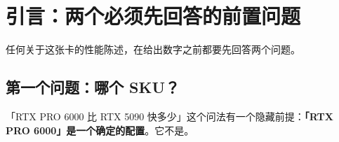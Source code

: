 \begin{abstract}
\textbf{第四，真正的差距出现在容量成为约束的边界上。} RTX 5090 无法加载 120B 模型，而这个系列以 \textbf{163.15 tok/s} 完成 GPT-OSS 120B；Llama 3.3 70B 上差距达 \textbf{928\%}。但这个百分比不是「更快」，而是「对方跑不了」。


\textbf{第五，与上代专业卡比，同一张卡有六个倍率，从 1.09 到 21.3，而它们都不假。}对 L40 Ada，多基准实测中位加速比 \textbf{1.09 倍}、胜率 78\%、最差 0.85 倍、最好 1.67 倍；而厂商宣称最高 \textbf{5.6 倍}（Llama 3 70B 单点口径）。\textbf{0.85 与 5.6 是同一对显卡。}规格上 L2 缓存相对 RTX A6000 是 21.3 倍，而对推理的意义接近于零。渲染则不同：SPECviewperf 15 中位 1.31 倍——因为渲染是算力受限，推理是带宽受限。


\textbf{第六，与数据中心卡的对位分维度给出三种相反结论。} 对 H100 NVL：FP32 领先 2.1 倍、价格便宜 2.1 倍，而 FP64 落后 15 倍、带宽落后 2.2 倍。而解码是带宽受限的，故\textbf{单流解码在物理上不可能追上 H100}——H100 SXM5 的 3,352 GB/s 是这张卡 1,792 GB/s 的 1.87 倍。成本上更尖锐：每芯片每小时 \$0.68 是所列芯片最低（GB300 的 29\%），但每百万 token \$0.19 是 GB300 的约 9.5 倍，因为并发约 10 对约 2,983。


\textbf{第七，同一模型在预填与解码上的排名不同。} DeepSeek-V4/4.1-Flash 是本档案实测最多的模型线（50 条主张、6 种硬件配置）。它在 300 W 档的解码上排第三（102.7 tok/s），在预填上排第四（6,341 tok/s）；同一个模型、同一批数据，两个榜给出不同名次。而它在双卡 RTX PRO 6000 WS 上经五次改动把预填从12,468 提到 13,811 tok/s（8k 上下文），并在单卡上跑满 1,048,576 上下文。


\textbf{第八，96 GB 的收益必须换算成上下文预算才有意义。} 按每 token \textbf{64 KiB} 的 FP16 KV 成本，262K 上下文需 \textbf{16 GiB}，1M 需 \textbf{64 GiB}——后者才是单卡的真实上限，而它的约束不是 KV 而是「剩余 32 GiB 能否装下权重」。



\end{abstract}
\section{引言：两个必须先回答的前置问题}

任何关于这张卡的性能陈述，在给出数字之前都要先回答两个问题。


\subsection{第一个问题：哪个 SKU？}

「RTX PRO 6000 比 RTX 5090 快多少」这个问法有一个隐藏前提：\textbf{「RTX PRO 6000」是一个确定的配置}。它不是。


